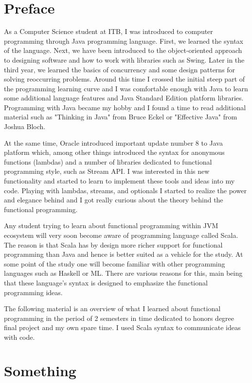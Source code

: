 \documentclass[12pt,twoside,a4paper]{report}
\begin{document}
\section{Preface}\label{6.2}
As a Computer Science student at ITB, I was introduced to computer programming through Java programming language. First, we learned the syntax of the language. Next, we have been introduced to the object-oriented approach to designing software and how to work with libraries such as Swing. Later in the third year, we learned the basics of concurrency and some design patterns for solving reoccurring problems. Around this time I crossed the initial steep part of the programming learning curve and I was comfortable enough with Java to learn some additional language features and Java Standard Edition platform libraries. Programming with Java became my hobby and I found a time to read additional material such as "Thinking in Java" from Bruce Eckel or "Effective Java" from Joshua Bloch.\par
At the same time, Oracle introduced important update number 8 to Java platform which, among other things introduced the syntax for anonymous functions (lambdas) and a number of libraries dedicated to functional programming style, such as Stream API. I was interested in this new functionality and started to learn to implement these tools and ideas into my code. Playing with lambdas, streams, and optionals I started to realize the power and elegance behind and I got really curious about the theory behind the functional programming.\par
Any student trying to learn about functional programming within JVM ecosystem will very soon become aware of programming language called Scala. The reason is that Scala has by design more richer support for functional programming than Java and hence is better suited as a vehicle for the study. At some point of the study one will become familiar with other programming languages such as Haskell or ML. There are various reasons for this, main being that these language's syntax is designed to emphasize the functional programming ideas.\par
The following material is an overview of what I learned about functional programming in the period of 2 semesters in time dedicated to honors degree final project and my own spare time. I used Scala syntax to communicate ideas with code.

\section{Something}\label{6.3}
\end{document}
